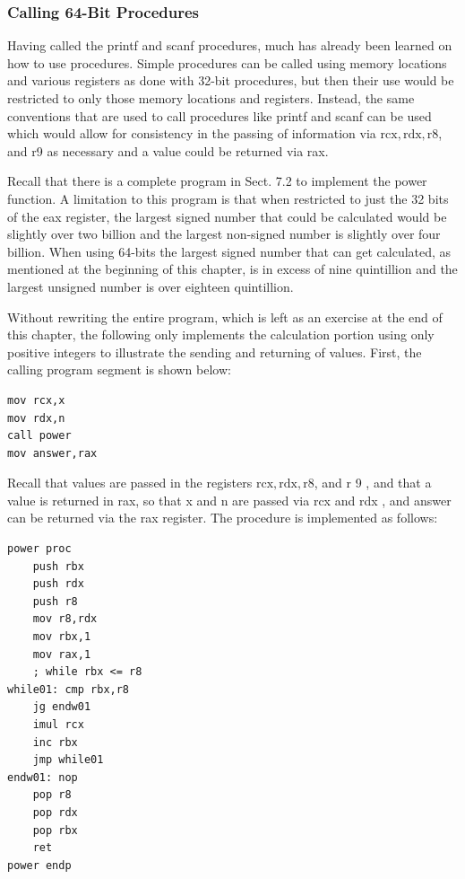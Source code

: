 \documentclass[10pt]{article}
\begin{document}
\subsubsection*{Calling 64-Bit Procedures}
Having called the printf and scanf procedures, much has already been learned on how to use procedures. Simple procedures can be called using memory locations and various registers as done with 32-bit procedures, but then their use would be restricted to only those memory locations and registers. Instead, the same conventions that are used to call procedures like printf and scanf can be used which would allow for consistency in the passing of information via $\mathrm{rcx}, \mathrm{rdx}, \mathrm{r} 8$, and r9 as necessary and a value could be returned via rax.

Recall that there is a complete program in Sect. 7.2 to implement the power function. A limitation to this program is that when restricted to just the 32 bits of the eax register, the largest signed number that could be calculated would be slightly over two billion and the largest non-signed number is slightly over four billion. When using 64-bits the largest signed number that can get calculated, as mentioned at the beginning of this chapter, is in excess of nine quintillion and the largest unsigned number is over eighteen quintillion.

Without rewriting the entire program, which is left as an exercise at the end of this chapter, the following only implements the calculation portion using only positive integers to illustrate the sending and returning of values. First, the calling program segment is shown below:

\begin{verbatim}
mov rcx,x
mov rdx,n
call power
mov answer,rax
\end{verbatim}

Recall that values are passed in the registers $\mathrm{rcx}, \mathrm{rdx}, \mathrm{r} 8$, and r 9 , and that a value is returned in rax, so that x and n are passed via rcx and rdx , and answer can be returned via the rax register. The procedure is implemented as follows:

\begin{verbatim}
power proc
    push rbx
    push rdx
    push r8
    mov r8,rdx
    mov rbx,1
    mov rax,1
    ; while rbx <= r8
while01: cmp rbx,r8
    jg endw01
    imul rcx
    inc rbx
    jmp while01
endw01: nop
    pop r8
    pop rdx
    pop rbx
    ret
power endp
\end{verbatim}
\end{document}
